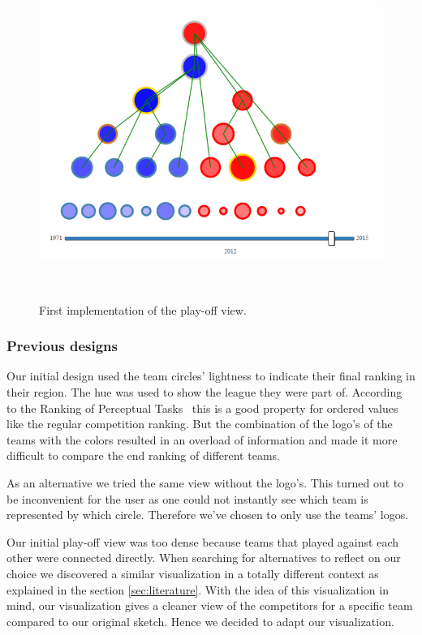 \documentclass[]{sigchi}
\begin{document}
\begin{figure}
\centering
  \includegraphics[width=0.9\columnwidth]{figures/playoffviewfirstimplemantation}
  \caption{First implementation of the play-off view.}~\label{fig:firstimplementationplayoffview}
\end{figure}


\subsubsection{Previous designs}
Our initial design used the team circles' lightness to indicate their final
ranking in their region. The hue was used to show the league they were part of.
According to the Ranking of Perceptual Tasks~\cite{automatingdesign} this is a
good property for ordered values like the regular competition ranking. But the
combination of the logo's of the teams with the colors resulted in an overload
of information and made it more difficult to compare the end ranking of
different teams. 

As an alternative we tried the same view without the logo's. This turned out to be 
inconvenient for the user as one could not instantly see which team is represented 
by which circle. Therefore we've chosen to only use the teams' logos.

Our initial play-off view was too dense because teams that played against each other were connected directly. When
searching for alternatives to reflect on our choice we discovered a similar
visualization in a totally different context\cite{whitehousepath} as explained in 
the section \ref{sec:literature}. With the idea of this visualization in mind, our 
visualization gives a cleaner view of the competitors for a specific team compared 
to our original sketch. Hence we decided to adapt our visualization.
\end{document}
